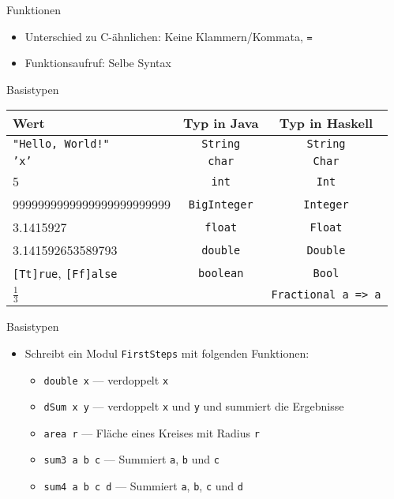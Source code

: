 \documentclass{beamer}
\newcommand{\false}{\ding{55}}
\newcommand{\code}[1]{
	\begin{mdframed}
		
	\end{mdframed}
}
\begin{document}
\begin{frame}{Funktionen}
	\code{demos/Maths.hs}

	\begin{itemize}
		\item Unterschied zu C-ähnlichen: Keine Klammern/Kommata, \texttt{=}
		\item Funktionsaufruf: Selbe Syntax
	\end{itemize}
\end{frame}

\begin{frame}{Basistypen}
	\begin{tabular}{ l | c | c }
		Wert & Typ in Java & Typ in Haskell \\
		\hline
		\texttt{"Hello, World!"} & \texttt{String} & \pause \texttt{String} \\
		\texttt{'x'} & \texttt{char} & \pause \texttt{Char} \\
		5 & \texttt{int} & \pause \texttt{Int} \\
		9999999999999999999999999 & \texttt{BigInteger} & \pause \texttt{Integer} \\
		3.1415927 & \texttt{float} & \pause \texttt{Float} \\
		3.141592653589793 & \texttt{double} & \pause \texttt{Double} \\
		\texttt{[Tt]rue}, \texttt{[Ff]alse} & \texttt{boolean} & \pause \texttt{Bool} \\
		$\frac{1}{3}$ & \false & \pause \texttt{Fractional a => a} \\
	\end{tabular}
\end{frame}

\begin{frame}{Basistypen}
	\code{demos/Maths.hs}

	\begin{itemize}
		\item Schreibt ein Modul \texttt{FirstSteps} mit folgenden Funktionen:
		\begin{itemize}
			\item \texttt{double x} --- verdoppelt \texttt{x}
			\item \texttt{dSum x y} --- verdoppelt \texttt{x} und \texttt{y} und summiert die Ergebnisse
			\item \texttt{area r} --- Fläche eines Kreises mit Radius \texttt{r}
			\item \texttt{sum3 a b c} --- Summiert \texttt{a}, \texttt{b} und \texttt{c}
			\item \texttt{sum4 a b c d} --- Summiert \texttt{a}, \texttt{b}, \texttt{c} und \texttt{d}
		\end{itemize}
	\end{itemize}
\end{frame}
\end{document}
